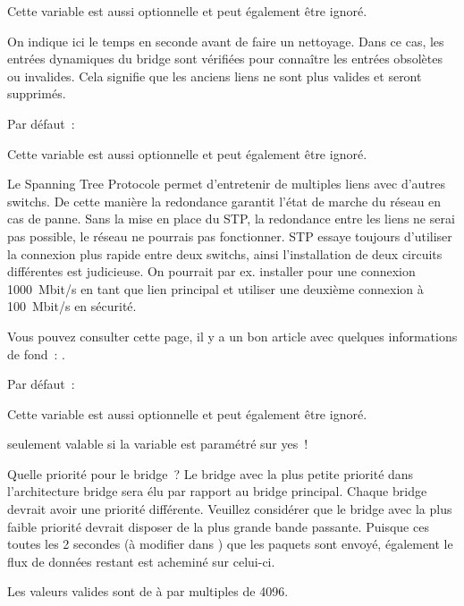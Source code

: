 \begin{description}
  Cette variable est aussi optionnelle et peut également être ignoré.

  On indique ici le temps en seconde avant de faire un \flqq{}nettoyage\frqq{}.
  Dans ce cas, les entrées dynamiques du bridge sont vérifiées pour connaître
  les entrées obsolètes ou invalides. Cela signifie que les anciens liens ne
  sont plus valides et seront supprimés.


  Par défaut~: 

  Cette variable est aussi optionnelle et peut également être ignoré.

  Le Spanning Tree Protocole permet d'entretenir de multiples liens
  avec d'autres switchs. De cette manière la redondance garantit l'état de
  marche du réseau en cas de panne. Sans la mise en place du STP, la redondance
  entre les liens ne serai pas possible, le réseau ne pourrais pas fonctionner.
  STP essaye toujours d'utiliser la connexion plus rapide entre deux switchs,
  ainsi l'installation de deux circuits différentes est judicieuse. On pourrait
  par ex. installer pour une connexion 1000~Mbit/s en tant que lien principal et
  utiliser une deuxième connexion à 100~Mbit/s en sécurité.
 
  Vous pouvez consulter cette page, il y a un bon article avec quelques
  informations de fond~:
  .


  Par défaut~: 

  Cette variable est aussi optionnelle et peut également être ignoré.

  seulement valable si la variable  est paramétré
  sur yes~!

  Quelle priorité pour le bridge~? Le bridge avec la plus petite priorité dans
  l'architecture bridge sera élu par rapport au bridge principal. Chaque
  bridge devrait avoir une priorité différente. Veuillez considérer que le bridge
  avec la plus faible priorité devrait disposer de la plus grande bande passante.
  Puisque ces toutes les 2 secondes (à modifier dans )
  que les paquets sont envoyé, également le flux de données restant est acheminé
  sur celui-ci.

  Les valeurs valides sont de  à  par multiples de 4096.


\end{description}
